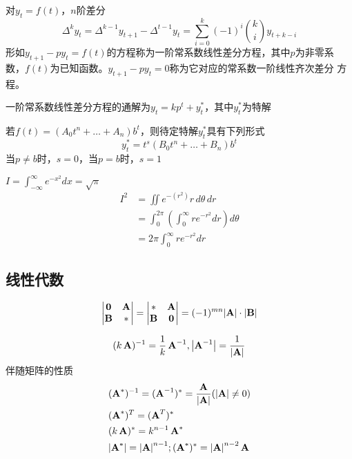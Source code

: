 \documentclass{article}
\begin{document}
对\(y_t=f(t)\)，\(n\)阶差分
\begin{equation*}
\Delta^ky_t=\Delta^{k-1}y_{t+1}-\Delta^{t-1}y_t=
\sum_{i=0}^k(-1)^i\binom{k}{i}y_{t+k-i}
\end{equation*}
形如\(y_{t+1}-py_t=f(t)\)的方程称为一阶常系数线性差分方程，其中\(p\)为非零系
数，\(f(t)\)为已知函数。\(y_{t+1}-py_t=0\)称为它对应的常系数一阶线性齐次差分
方程。

一阶常系数线性差分方程的通解为\(y_t=kp^t+y_t^*\)，其中\(y^*_t\)为特解

若\(f(t)=(A_0t^n+\dots+A_n)b^t\)，则待定特解\(y^*_t\)具有下列形式
\begin{equation*}
y_t^*=t^s(B_0t^n+\dots+B_n)b^t
\end{equation*}
当\(p\neq b\)时，\(s=0\)，当\(p=b\)时，\(s=1\)

\(I=\int_{-\infty}^\infty e^{-x^2}dx=\sqrt{\pi}\)
\begin{align}
I^2 &= \iint e^{-(r^2)}r\,d\theta\,dr \\
&=\int_0^{2\pi}\left(\int_0^\infty re^{-r^2}dr\right)d\theta \\
&=2\pi\int_0^\infty re^{-r^2}dr
\end{align}

\subsection{线性代数}
\label{sec:org30eb6a2}
\begin{equation*}
\begin{vmatrix}
\bzero&\bA\\\bB&*
\end{vmatrix}=
\begin{vmatrix}
*&\bA\\\bB&\bzero
\end{vmatrix}=
(-1)^{mn}\abs{\bA}\cdot\abs{\bB}
\end{equation*}

\begin{equation*}
(k\bA)^{-1}=\frac{1}{k}\bA^{-1},\abs{\bA^{-1}}=\frac{1}{\abs{\bA}}
\end{equation*}
伴随矩阵的性质
\begin{align*}
&(\bA^*)^{-1}=(\bA^{-1})^*=\frac{\bA}{\abs{\bA}}(\abs{\bA}\neq0)\\
&(\bA^*)^T=(\bA^T)^*\\
&(k\bA)^*=k^{n-1}\bA^*\\
&\abs{\bA^*}=\abs{\bA}^{n-1};(\bA^*)^*=\abs{\bA}^{n-2}\bA
\end{align*}
\end{document}

